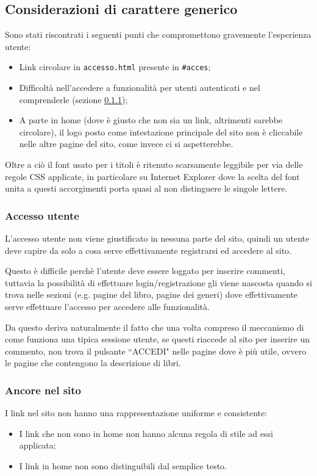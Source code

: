 \subsection{Considerazioni di carattere generico}
Sono stati riscontrati i seguenti punti che compromettono gravemente
l'esperienza utente:
\begin{itemize}
\item Link circolare in \texttt{accesso.html} presente in \texttt{\#acces};
\item Difficoltà nell'accedere a funzionalità per utenti autenticati e nel
comprenderle (sezione \ref{sec:user-login});
\item A parte in home (dove è giusto che non sia un link, altrimenti sarebbe
circolare), il logo posto come intestazione principale del sito non è
cliccabile nelle altre pagine del sito, come invece ci si aspetterebbe.
\end{itemize}

Oltre a ciò il font usato per i titoli è ritenuto scarsamente leggibile per
via delle regole CSS applicate, in particolare su Internet Explorer dove la
scelta del font unita a questi accorgimenti porta quasi al non distinguere le
singole lettere.

\subsubsection{Accesso utente}\label{sec:user-login}
L'accesso utente non viene giustificato in nessuna parte del sito, quindi un
utente deve capire da solo a cosa serve effettivamente registrarsi ed accedere
al sito.

Questo è difficile perchè l'utente deve essere loggato per inserire commenti,
tuttavia la possibilità di effettuare login/registrazione gli viene nascosta
quando si trova nelle sezioni (e.g. pagine del libro, pagine dei generi) dove
effettivamente serve effettuare l'accesso per accedere alle funzionalità.

Da questo deriva naturalmente il fatto che una volta compreso il meccanismo di
come funziona una tipica sessione utente, se questi riaccede al sito per
inserire un commento, non trova il pulsante ``ACCEDI" nelle pagine dove è più
utile, ovvero le pagine che contengono la descrizione di libri.

\subsubsection{Ancore nel sito}\label{sec:user-ancore}
I link nel sito non hanno una rappresentazione uniforme e consistente:
\begin{itemize}
\item I link che non sono in home non hanno alcuna regola di stile ad essi
applicata;
\item I link in home non sono distinguibili dal semplice testo.
\end{itemize}

